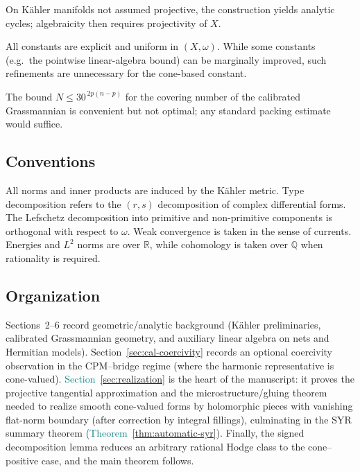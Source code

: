 \documentclass[11pt]{article}
\newcommand{\REVMZ}[1]{\textcolor{teal}{#1}}  %
\numberwithin{equation}{section}  %
\theoremstyle{plain}
\theoremstyle{definition}
\theoremstyle{remark}
\newcommand{\R}{\mathbb{R}}
\newcommand{\Q}{\mathbb{Q}}
\begin{document}
On K\"ahler manifolds not assumed projective, the construction yields analytic cycles; algebraicity then requires projectivity of $X$.

All constants are explicit and uniform in $(X,\omega)$.
While some constants (e.g.\ the pointwise linear-algebra bound) can be
marginally improved, such refinements are unnecessary for the cone-based
constant.

The bound $N \le 30^{\,2p(n-p)}$ for the covering number of the calibrated
Grassmannian is convenient but not optimal; any standard packing estimate would
suffice.

\subsection*{Conventions}

All norms and inner products are induced by the K\"ahler metric.  Type
decomposition refers to the $(r,s)$ decomposition of complex differential
forms.  The Lefschetz decomposition into primitive and non-primitive components
is orthogonal with respect to $\omega$.  Weak convergence is taken in the sense
of currents.  Energies and $L^{2}$ norms are over $\R$, while cohomology is
taken over $\Q$ when rationality is required.

\subsection*{Organization}


Sections~2--6 record geometric/analytic background (K\"ahler preliminaries, calibrated Grassmannian geometry, and auxiliary linear algebra on nets and Hermitian models).
Section~\ref{sec:cal-coercivity} records an optional coercivity observation in the CPM--bridge regime (where the harmonic representative is cone-valued).
\REVMZ{Section~\ref{sec:realization}} is the heart of the manuscript: it proves the projective tangential approximation and the microstructure/gluing theorem needed to realize smooth cone-valued forms by holomorphic pieces with vanishing flat-norm boundary (after correction by integral fillings), culminating in the SYR summary theorem (\REVMZ{Theorem~\ref{thm:automatic-syr}}).
Finally, the signed decomposition lemma reduces an arbitrary rational Hodge class to the cone--positive case, and the main theorem follows.
\end{document}
